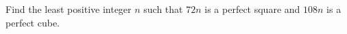 Find the least positive integer $n$ such that $72n$ is a perfect square and $108n$ is a perfect cube.
